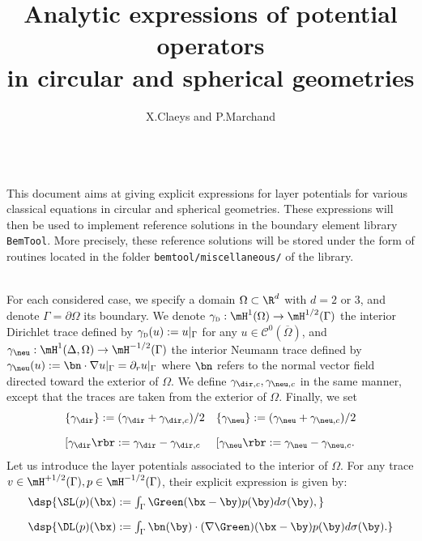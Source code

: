 \documentclass[a4paper,11pt]{article}
\date{}
\author{X.Claeys and P.Marchand}
\title{Analytic expressions of potential operators\\ in circular and spherical geometries}
\begin{document}
\maketitle



\quad\\
This document aims at giving explicit  expressions for layer potentials for various classical
equations in circular and spherical geometries. These expressions will then be used to implement
reference solutions in the boundary element library \verb?BemTool?. More precisely, these reference
solutions will be stored under the form of routines located in the folder
\verb?bemtool/miscellaneous/? of the library.



\quad\\
For each considered case, we specify a  domain $\Omega\subset \R^{d}$ with $d=2$ or $3$, and denote
$\Gamma = \partial\Omega$ its boundary. We denote $\gamma_{\textsc{d}}:\mH^{1}(\Omega)\to \mH^{1/2}(\Gamma)$ the
interior Dirichlet trace defined by $\gamma_{\textsc{d}}(u):= u\vert_{\Gamma}$ for any $u\in \mathscr{C}^{0}(\overline{\Omega})$,
and  $\gamma_{\neu}:\mH^{1}(\Delta,\Omega)\to \mH^{-1/2}(\Gamma)$ the interior Neumann trace defined by
$\gamma_{\neu}(u) := \bn\cdot\nabla u\vert_{\Gamma} = \partial_{r}u\vert_{\Gamma}$ where $\bn$ refers to
the normal vector field directed toward the exterior of $\Omega$. We define $\gamma_{\dir,c},\gamma_{\neu,c}$ in the
same manner, except that the traces are taken from the exterior of $\Omega$. Finally, we set
$$
\begin{array}{ll}
\{\gamma_{\dir}\}:= (\gamma_{\dir}+\gamma_{\dir,c})/2 &  \{\gamma_{\neu}\}:= (\gamma_{\neu}+\gamma_{\neu,c})/2\\[10pt]
\lbrack\gamma_{\dir}\rbr:=\gamma_{\dir}-\gamma_{\dir,c} & \lbrack\gamma_{\neu}\rbr:=\gamma_{\neu}-\gamma_{\neu,c}.
\end{array}
$$
Let us introduce the layer potentials associated to the interior of $\Omega$.
For any trace $v\in\mH^{+1/2}(\Gamma), p\in\mH^{-1/2}(\Gamma)$, their explicit expression
is given by:
\begin{equation}\label{PotentialOperators}
\begin{array}{l}
\dsp{ \SL(p)(\bx):=\int_{\Gamma}\Green(\bx-\by)p(\by) d\sigma(\by), }\\[10pt]
\dsp{ \DL(p)(\bx):=\int_{\Gamma}\bn(\by)\cdot(\nabla\Green)(\bx-\by)p(\by) d\sigma(\by). }
\end{array}
\end{equation}
\end{document}
